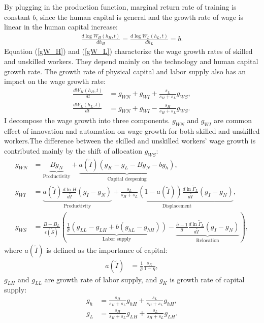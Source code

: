 \documentclass[12pt]{article}
\begin{document}
By plugging in the production function, marginal return rate of training is constant $b$, since the human capital is general and the growth rate of wage is linear in the human capital increase: 
\begin{align*}
\frac{d\log W_H(h_H,t)}{dh_H} = \frac{d\log W_L(h_L,t)}{dh_L} = b.
\end{align*}
Equation (\ref{gW_H}) and (\ref{gW_L}) characterize the wage growth rates of skilled and unskilled workers. They depend mainly on the technology and human capital growth rate. The growth rate of physical capital and labor supply also has an impact on the wage growth rate:
\begin{align}
\label{gW_H}
\frac{dW_H(h_H,t)}{dt} &= g_{WN}+g_{WI}+\frac{s_L}{s_H+s_L}g_{WS},\\
\label{gW_L}
\frac{dW_L(h_L,t)}{dt}  &= g_{WN}+g_{WI}-\frac{s_H}{s_H+s_L}g_{WS}.
\end{align}
I decompose the wage growth into three components. $g_{WN}$ and $g_{WI}$ are common effect of innovation and automation on wage growth for both skilled and unskilled workers.The difference between the skilled and unskilled workers' wage growth is contributed mainly by the shift of allocation $g_{WS}$:  
\begin{align}
\label{g_WN}
g_{WN} &= \underbrace{Bg_N}_{\text{Productivity}}+\underbrace{a(\tilde{I})(g_K-g_L-Bg_N-bg_h)}_{\text{Capital deepening}}, \\
\label{g_WI}
g_{WI} &= \underbrace{a(\tilde{I})\frac{d\ln H}{d\tilde{I}}(g_I-g_N)}_{\text{Productivity}}+\underbrace{\frac{s_L}{s_H+s_L}(1-a(\tilde{I}))\frac{d\ln \tilde{\Gamma}_L}{d\tilde{I}}(g_I-g_N)}_{\text{Displacement}}, \\
\label{g_WS}
g_{WS}&= \frac{B-B_L}{\epsilon(\tilde{S})}(\underbrace{\frac{1}{\hat{\sigma}}(g_{LL}-g_{LH}+b(g_{hL}-g_{hH}))}_{\text{Labor supply}}-\underbrace{\frac{\hat{\sigma}-1}{\hat{\sigma}}\frac{d\ln \tilde{\Gamma}_L}{d\tilde{I}}(g_I-g_N)}_{\text{Relocation}}),
\end{align}
where $a(\tilde{I})$ is defined as the importance of capital:
\begin{align*}
a(\tilde{I}) &= \frac{1}{\hat{\sigma}}\frac{s_K}{1-\eta},
\end{align*}
$g_{LH}$ and $g_{LL}$ are growth rate of labor supply, and $g_K$ is growth rate of capital supply:
\begin{align*}
g_h &= \frac{s_H}{s_H+s_L}g_{hH}+\frac{s_L}{s_H+s_L}g_{hH}, \\
g_L &= \frac{s_H}{s_H+s_L}g_{LH}+\frac{s_L}{s_H+s_L}g_{LH}.
\end{align*}
\end{document}
